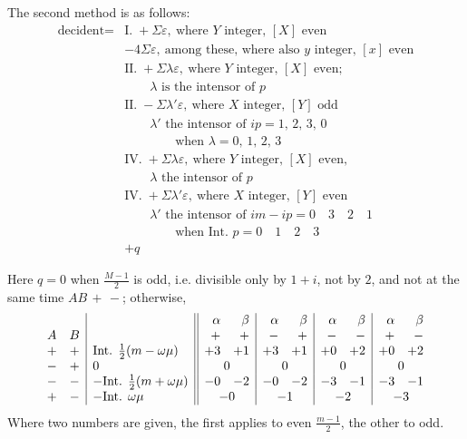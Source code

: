 The second method is as follows:
\[
\begin{aligned}
\text{decident}={}&\text{I.}\;+\Sigma\varepsilon,\ \text{where }Y\text{ integer, }[X]\text{ even}\\
&-4\Sigma\varepsilon,\ \text{among these, where also }y\text{ integer, }[x]\text{ even}\\
&\text{II.}\;+\Sigma\lambda\varepsilon,\ \text{where }Y\text{ integer, }[X]\text{ even;}\\
&\qquad\lambda\text{ is the intensor of }p\\
&\text{II.}\;-\Sigma\lambda'\varepsilon,\ \text{where }X\text{ integer, }[Y]\text{ odd}\\
&\qquad\lambda'\text{ the intensor of }ip=1,\,2,\,3,\,0\\
&\qquad\qquad\text{when }\lambda=0,\,1,\,2,\,3\\
&\text{IV.}\;+\Sigma\lambda\varepsilon,\ \text{where }Y\text{ integer, }[X]\text{ even,}\\
&\qquad\lambda\text{ the intensor of }p\\
&\text{IV.}\;+\Sigma\lambda'\varepsilon,\ \text{where }X\text{ integer, }[Y]\text{ even}\\
&\qquad\lambda'\text{ the intensor of }im-ip=0\quad3\quad2\quad1\\
&\qquad\qquad\text{when Int. }p=0\quad1\quad2\quad3\\
&+q
\end{aligned}
\]

Here $q=0$ when $\frac{M-1}{2}$ is odd, i.e. divisible only by $1+i$, not by $2$, and not at the same time $AB\,+\,-$; otherwise,
\begingroup\small\setlength{\arraycolsep}{2pt}
\[
\begin{array}{cc|l||rr|rr|rr|rr}
&&&\alpha&\beta&\alpha&\beta&\alpha&\beta&\alpha&\beta\\
A&B&&+&+&-&+&-&-&+&-\\
+&+&\text{Int. }\frac12(m-\omega\mu)&+3&+1&+3&+1&+0&+2&+0&+2\\
-&+&0&\multicolumn{2}{c|}{0}&\multicolumn{2}{c|}{0}&\multicolumn{2}{c|}{0}&\multicolumn{2}{c}{0}\\
-&-&-\text{Int. }\frac12(m+\omega\mu)&-0&-2&-0&-2&-3&-1&-3&-1\\
+&-&-\text{Int. }\omega\mu&\multicolumn{2}{c|}{-0}&\multicolumn{2}{c|}{-1}&\multicolumn{2}{c|}{-2}&\multicolumn{2}{c}{-3}
\end{array}
\]
\endgroup
Where two numbers are given, the first applies to even $\frac{m-1}{2}$, the other to odd.

